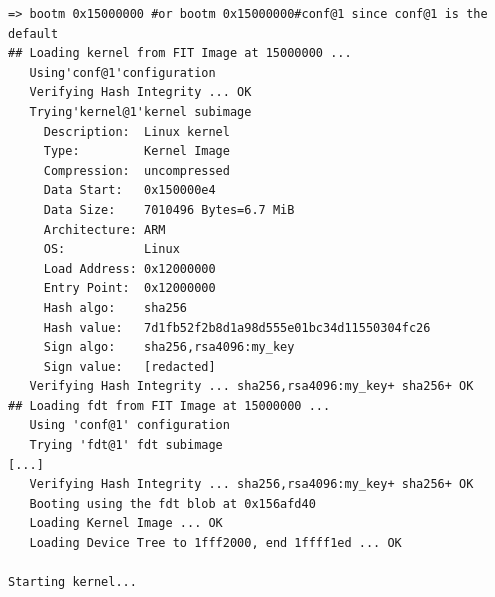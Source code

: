 \documentclass[aspectratio=169]{beamer}
\begin{document}
\begin{frame}[fragile]
\begin{lstlisting}[style=shell,basicstyle=\tiny\ttfamily\color{white}]
=> bootm 0x15000000 #or bootm 0x15000000#conf@1 since conf@1 is the default
## Loading kernel from FIT Image at 15000000 ...
   Using'conf@1'configuration
   Verifying Hash Integrity ... OK
   Trying'kernel@1'kernel subimage
     Description:  Linux kernel
     Type:         Kernel Image
     Compression:  uncompressed
     Data Start:   0x150000e4
     Data Size:    7010496 Bytes=6.7 MiB
     Architecture: ARM
     OS:           Linux
     Load Address: 0x12000000
     Entry Point:  0x12000000
     Hash algo:    sha256
     Hash value:   7d1fb52f2b8d1a98d555e01bc34d11550304fc26
     Sign algo:    sha256,rsa4096:my_key
     Sign value:   [redacted]
   Verifying Hash Integrity ... sha256,rsa4096:my_key+ sha256+ OK
## Loading fdt from FIT Image at 15000000 ...
   Using 'conf@1' configuration
   Trying 'fdt@1' fdt subimage
[...]
   Verifying Hash Integrity ... sha256,rsa4096:my_key+ sha256+ OK
   Booting using the fdt blob at 0x156afd40
   Loading Kernel Image ... OK
   Loading Device Tree to 1fff2000, end 1ffff1ed ... OK

Starting kernel...
\end{lstlisting}
\end{frame}



%
%
%
%
\end{document}
